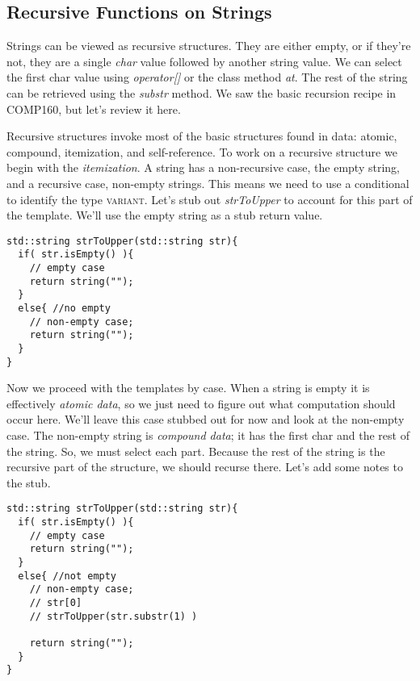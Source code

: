 \documentclass[]{tufte-handout}
\begin{document}
\subsection{Recursive Functions on Strings} 

Strings can be viewed as recursive structures.  They are either empty, or if they're not, they are a single \textit{char} value followed by another string value.  We can select the first char value using \textit{operator[]} or the class method \textit{at}.  The rest of the string can be retrieved using the \textit{substr} method.  We saw the basic recursion recipe in COMP160, but let's review it here.  

Recursive structures invoke most of the basic structures found in data: atomic, compound, itemization, and self-reference.  To work on a recursive structure we begin with the \textit{itemization}. A string has a non-recursive case, the empty string, and a recursive case, non-empty strings.  This means we need to use a conditional to identify the type \textsc{variant}.  Let's stub out \textit{strToUpper} to account for this part of the template. We'll use the empty string as a stub return value.

\begin{verbatim}
std::string strToUpper(std::string str){
  if( str.isEmpty() ){
    // empty case
    return string("");
  } 
  else{ //no empty
    // non-empty case;
    return string("");
  }
}
\end{verbatim}

Now we proceed with the templates by case. When a string is empty it is effectively \textit{atomic data}, so we just need to figure out what computation should occur here.  We'll leave this case  stubbed out for now and look at the non-empty case. The non-empty string is \textit{compound data}; it has the first char and the rest of the string. So, we must select each part.  Because the rest of the string is the recursive part of the structure, we should recurse there. Let's add some notes to the stub.  
\begin{verbatim}
std::string strToUpper(std::string str){
  if( str.isEmpty() ){
    // empty case
    return string("");
  } 
  else{ //not empty
    // non-empty case;
    // str[0]
    // strToUpper(str.substr(1) )
  
    return string("");
  }
}
\end{verbatim}
\end{document}

